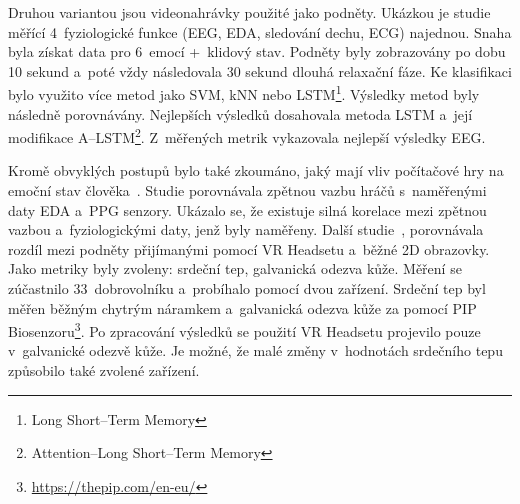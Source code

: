         Druhou variantou jsou videonahrávky použité jako podněty. Ukázkou je studie~\cite{video_emotion} měřící 4~fyziologické funkce (EEG, EDA, sledování dechu, ECG) najednou. Snaha byla získat data pro 6~emocí +~klidový stav. Podněty byly zobrazovány po dobu 10 sekund a~poté vždy následovala 30 sekund dlouhá relaxační fáze. Ke klasifikaci bylo využito více metod jako SVM, kNN nebo LSTM\footnote{Long Short--Term Memory}. Výsledky metod byly následně porovnávány. Nejlepších výsledků dosahovala metoda LSTM a~její modifikace A--LSTM\footnote{Attention--Long Short--Term Memory}. Z~měřených metrik vykazovala nejlepší výsledky EEG. 
        
        Kromě obvyklých postupů bylo také zkoumáno, jaký mají vliv počítačové hry na emoční stav člověka~\cite{fps_emotions}. Studie porovnávala zpětnou vazbu hráčů s~naměřenými daty EDA a~PPG senzory. Ukázalo se, že existuje silná korelace mezi zpětnou vazbou a~fyziologickými daty, jenž byly naměřeny. Další studie~\cite{vr_emotions}, porovnávala rozdíl mezi podněty přijímanými pomocí VR Headsetu a~běžné 2D obrazovky. Jako metriky byly zvoleny: srdeční tep, galvanická odezva kůže. Měření se zúčastnilo 33~dobrovolníku a~probíhalo pomocí dvou zařízení. Srdeční tep byl měřen běžným chytrým náramkem a~galvanická odezva kůže za pomocí PIP Biosenzoru\footnote{\url{https://thepip.com/en-eu/}}. Po zpracování výsledků se použití VR Headsetu projevilo pouze v~galvanické odezvě kůže. Je možné, že malé změny v~hodnotách srdečního tepu způsobilo také zvolené zařízení.
        
        \vspace{3mm}
        
        